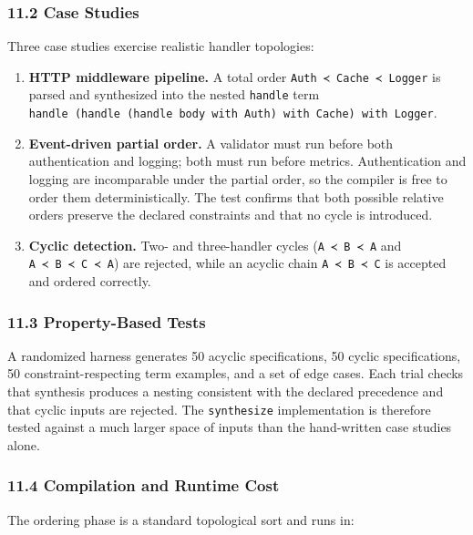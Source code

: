 \documentclass[
  11pt,
]{article}
\providecommand{\tightlist}{%
  \setlength{\itemsep}{0pt}\setlength{\parskip}{0pt}}
\begin{document}
\subsubsection{11.2 Case Studies}\label{case-studies}

Three case studies exercise realistic handler topologies:

\begin{enumerate}
\def\labelenumi{\arabic{enumi}.}
\tightlist
\item
  \textbf{HTTP middleware pipeline.} A total order
  \texttt{Auth\ ≺\ Cache\ ≺\ Logger} is parsed and synthesized into the
  nested \texttt{handle} term
  \texttt{handle\ (handle\ (handle\ body\ with\ Auth)\ with\ Cache)\ with\ Logger}.
\item
  \textbf{Event-driven partial order.} A validator must run before both
  authentication and logging; both must run before metrics.
  Authentication and logging are incomparable under the partial order,
  so the compiler is free to order them deterministically. The test
  confirms that both possible relative orders preserve the declared
  constraints and that no cycle is introduced.
\item
  \textbf{Cyclic detection.} Two- and three-handler cycles
  (\texttt{A\ ≺\ B\ ≺\ A} and \texttt{A\ ≺\ B\ ≺\ C\ ≺\ A}) are
  rejected, while an acyclic chain \texttt{A\ ≺\ B\ ≺\ C} is accepted
  and ordered correctly.
\end{enumerate}

\subsubsection{11.3 Property-Based Tests}\label{property-based-tests}

A randomized harness generates 50 acyclic specifications, 50 cyclic
specifications, 50 constraint-respecting term examples, and a set of
edge cases. Each trial checks that synthesis produces a nesting
consistent with the declared precedence and that cyclic inputs are
rejected. The \texttt{synthesize} implementation is therefore tested
against a much larger space of inputs than the hand-written case studies
alone.

\subsubsection{11.4 Compilation and Runtime
Cost}\label{compilation-and-runtime-cost}

The ordering phase is a standard topological sort and runs in:
\end{document}
